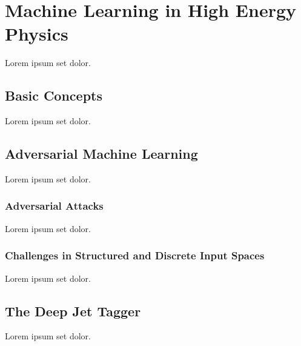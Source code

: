 \chapter{Machine Learning in High Energy Physics}
Lorem ipsum set dolor.

\section{Basic Concepts}
Lorem ipsum set dolor.

\section{Adversarial Machine Learning}
Lorem ipsum set dolor.

\subsection{Adversarial Attacks}
Lorem ipsum set dolor.

\subsection{Challenges in Structured and Discrete Input Spaces}
Lorem ipsum set dolor.

\section{The Deep Jet Tagger}
Lorem ipsum set dolor.